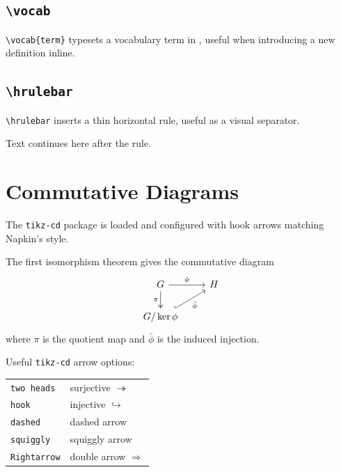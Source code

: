 \documentclass[11pt]{scrartcl}
\begin{document}
\subsection{\texttt{\textbackslash vocab}}

\verb|\vocab{term}| typesets a vocabulary term in ,
useful when introducing a new definition inline.

\subsection{\texttt{\textbackslash hrulebar}}

\verb|\hrulebar| inserts a thin horizontal rule, useful as a visual separator.

\hrulebar

Text continues here after the rule.

\section{Commutative Diagrams}

The \texttt{tikz-cd} package is loaded and configured with hook arrows
matching Napkin's style.

\begin{example}
    The first isomorphism theorem gives the commutative diagram
    \[
    \begin{tikzcd}
        G \arrow[r, "\phi"] \arrow[d, "\pi"', two heads]
            & H \\
        G/\ker\phi \arrow[ru, "\bar\phi"', hook]
    \end{tikzcd}
    \]
    where $\pi$ is the quotient map and $\bar\phi$ is the induced injection.
\end{example}

Useful \texttt{tikz-cd} arrow options:

\begin{center}
\begin{tabular}{ll}
    \verb|two heads|    & surjective $\twoheadrightarrow$ \\
    \verb|hook|         & injective $\hookrightarrow$ \\
    \verb|dashed|       & dashed arrow \\
    \verb|squiggly|     & squiggly arrow \\
    \verb|Rightarrow|   & double arrow $\Rightarrow$ \\
\end{tabular}
\end{center}
\end{document}

